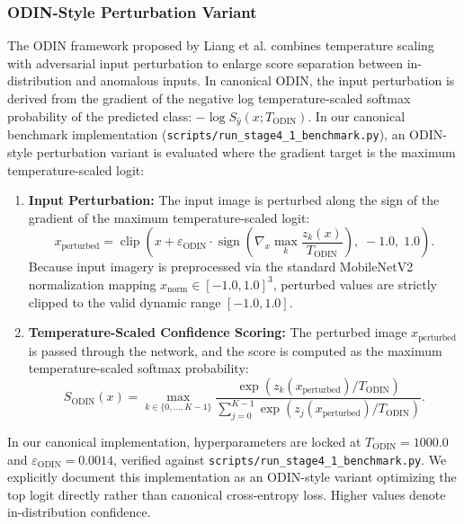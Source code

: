 \subsubsection{ODIN-Style Perturbation Variant}
The ODIN framework proposed by Liang et al. \cite{liang2018enhancing} combines temperature scaling with adversarial input perturbation to enlarge score separation between in-distribution and anomalous inputs. In canonical ODIN, the input perturbation is derived from the gradient of the negative log temperature-scaled softmax probability of the predicted class: $-\log S_{\hat{y}}(x; T_{\text{ODIN}})$. In our canonical benchmark implementation ({\small\nolinkurl{scripts/run_stage4_1_benchmark.py}}), an ODIN-style perturbation variant is evaluated where the gradient target is the maximum temperature-scaled logit:
\begin{enumerate}
\item \textbf{Input Perturbation:} The input image is perturbed along the sign of the gradient of the maximum temperature-scaled logit:
\begin{equation}
x_{\text{perturbed}} = \operatorname{clip}\left( x + \varepsilon_{\text{ODIN}} \cdot \operatorname{sign}\left( \nabla_x \max_{k} \frac{z_k(x)}{T_{\text{ODIN}}} \right), \; -1.0, \; 1.0 \right).
\end{equation}
Because input imagery is preprocessed via the standard MobileNetV2 normalization mapping $x_{\text{norm}} \in [-1.0, 1.0]^3$, perturbed values are strictly clipped to the valid dynamic range $[-1.0, 1.0]$.
\item \textbf{Temperature-Scaled Confidence Scoring:} The perturbed image $x_{\text{perturbed}}$ is passed through the network, and the score is computed as the maximum temperature-scaled softmax probability:
\begin{equation}
S_{\text{ODIN}}(x) = \max_{k \in \{0, \dots, K-1\}} \frac{\exp(z_k(x_{\text{perturbed}}) / T_{\text{ODIN}})}{\sum_{j=0}^{K-1} \exp(z_j(x_{\text{perturbed}}) / T_{\text{ODIN}})}.
\end{equation}
\end{enumerate}
In our canonical implementation, hyperparameters are locked at $T_{\text{ODIN}} = 1000.0$ and $\varepsilon_{\text{ODIN}} = 0.0014$, verified against {\small\nolinkurl{scripts/run_stage4_1_benchmark.py}}. We explicitly document this implementation as an ODIN-style variant optimizing the top logit directly rather than canonical cross-entropy loss. Higher values denote in-distribution confidence.

